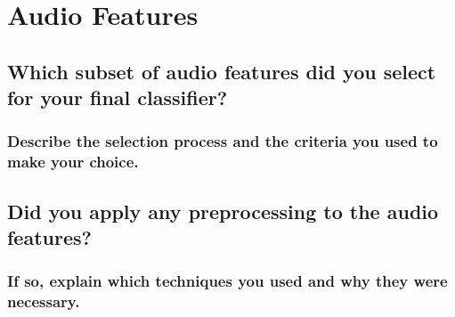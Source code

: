 
\section{Audio Features}
\label{sec:Audio Features}






\subsection{Which subset of audio features did you select for your final classifier? }
\label{sec:Audio Features:a}



\subsubsection{Describe the selection process and the criteria you used to make your choice. }
\label{sec:Audio Feature:a-1}






\subsection{Did you apply any preprocessing to the audio features? }
\label{sec:Audio Features:b}



\subsubsection{If so, explain which techniques you used and why they were necessary. }
\label{sec:Audio Feature:b-1}



